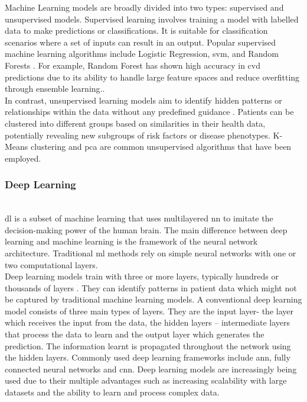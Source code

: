 \noindent Machine Learning models are broadly divided into two types: supervised and unsupervised models. Supervised learning involves training a model with labelled data to make predictions or classifications. It is suitable for classification scenarios where a set of inputs can result in an output. Popular supervised machine learning algorithms include Logistic Regression, \gls{svm}, and Random Forests \citep{lee2023shap}.
For example, Random Forest has shown high
accuracy in \gls{cvd} predictions due to its ability to handle large feature spaces and reduce
overfitting through ensemble learning.\citep{breiman2001random}. \\
In contrast, unsupervised learning models aim to identify hidden patterns or relationships within the data without any predefined guidance \citep{careervira2023}. Patients can be clustered into different groups based on similarities in their health data, potentially revealing new subgroups of risk factors or disease phenotypes. K-Means clustering and \gls{pca} are common unsupervised algorithms that have been employed.\vspace{0.5em}

\subsubsection{Deep Learning} \leavevmode
\\\gls{dl} is a subset of machine learning that uses multilayered \gls{nn} to imitate the decision-making power of the human brain. The main difference between deep learning and machine learning is the framework of the neural network architecture. Traditional \gls{ml} methods rely on simple neural networks with one or two computational layers. \\
\noindent Deep learning models train with three or more layers, typically hundreds or thousands of layers  \citep{ibm2024deeplearning}. They can identify patterns in patient data which might not be captured by traditional machine learning models. A conventional deep learning model consists of three main types of layers. They are the input layer- the layer which receives the input from the data, the hidden layers – intermediate layers that process the data to learn and the output layer which generates the prediction. The information learnt is propagated throughout the network using the hidden layers. Commonly used deep learning frameworks include \gls{ann}, fully connected neural networks and \gls{cnn}. Deep learning models are increasingly being used due to their multiple advantages such as increasing scalability with large datasets and the ability to learn and process complex data. \vspace{0.5em}

